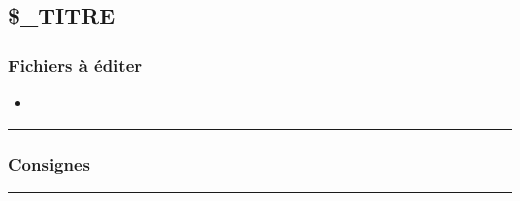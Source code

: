 \documentclass[a4paper,10pt]{article}
\begin{document}
\color{green}
\subsection{\$\_TITRE}\color{white}

\color{blue}
\subsubsection{Fichiers à éditer}\color{white}
\begin{itemize}
    \item \textbf{\color{lime}\color{white}}
\end{itemize}



\color{blue}\par\noindent\rule{\textwidth}{0.4pt}\color{white}

\color{blue}
\subsubsection{Consignes}\color{white}



\color{green}\par\noindent\rule{\textwidth}{0.4pt}\color{white}
\end{document}

